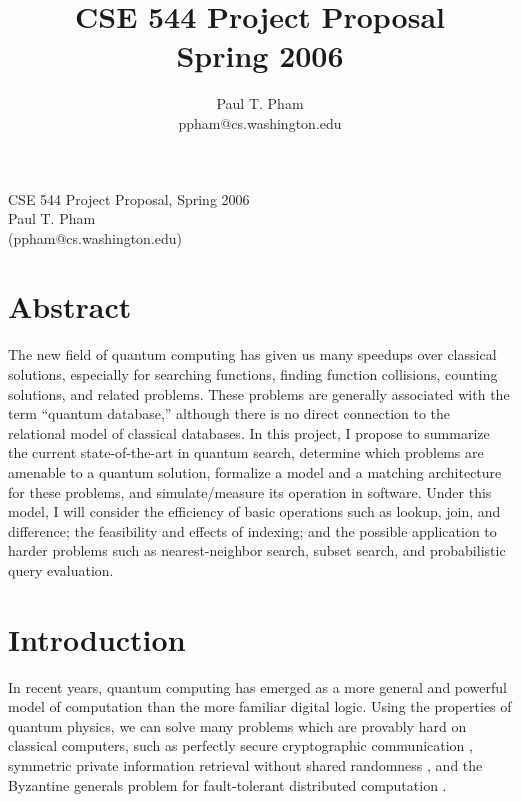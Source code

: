 \documentclass{toc}
\title{CSE 544 Project Proposal\\Spring 2006}
\author{Paul T. Pham\\ppham@cs.washington.edu}
\theoremstyle{plain}
\theoremstyle{definition}
\begin{document}
\begin{center}
\LARGE{CSE 544 Project Proposal, Spring 2006}\\
\vspace{\baselineskip}
\Large{Paul T. Pham\\ (ppham@cs.washington.edu)}
\end{center}

\section{Abstract}

The new field of quantum computing has given us many speedups over classical
solutions, especially for searching functions, finding function collisions,
counting solutions, and related problems. These problems are generally
associated with the term ``quantum database,'' although there is no
direct connection to the relational model of classical databases.
In this project, I propose to summarize the current state-of-the-art in
quantum search, determine which problems are amenable to a quantum
solution, formalize a model and a matching architecture for these
problems, and simulate/measure its operation in software.
Under this model, I will consider the efficiency of basic operations such
as lookup, join, and difference; the feasibility and
effects of indexing; and the possible application to harder problems such as
nearest-neighbor search, subset search, and probabilistic query evaluation.

\section{Introduction}

In recent years, quantum computing has emerged as a more general and
powerful model of computation than the more familiar digital logic.
Using the properties of quantum physics, we can solve many problems which are
provably hard on classical computers, such as
perfectly secure cryptographic communication \cite{lc99},
symmetric private information retrieval without shared randomness \cite{kw04},
and the Byzantine generals problem for fault-tolerant distributed computation
\cite{cabello03}.
\end{document}
